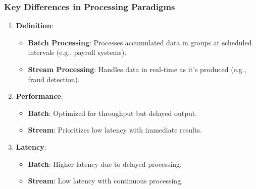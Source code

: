 \documentclass[aspectratio=169]{beamer}
\begin{document}
\begin{frame}[fragile]
    \frametitle{Key Differences in Processing Paradigms}
    \begin{enumerate}
        \item \textbf{Definition}:
        \begin{itemize}
            \item \textbf{Batch Processing}: Processes accumulated data in groups at scheduled intervals (e.g., payroll systems).
            \item \textbf{Stream Processing}: Handles data in real-time as it's produced (e.g., fraud detection).
        \end{itemize}

        \item \textbf{Performance}:
        \begin{itemize}
            \item \textbf{Batch}: Optimized for throughput but delayed output.
            \item \textbf{Stream}: Prioritizes low latency with immediate results.
        \end{itemize}

        \item \textbf{Latency}:
        \begin{itemize}
            \item \textbf{Batch}: Higher latency due to delayed processing.
            \item \textbf{Stream}: Low latency with continuous processing.
        \end{itemize}
    \end{enumerate}
\end{frame}
\end{document}
